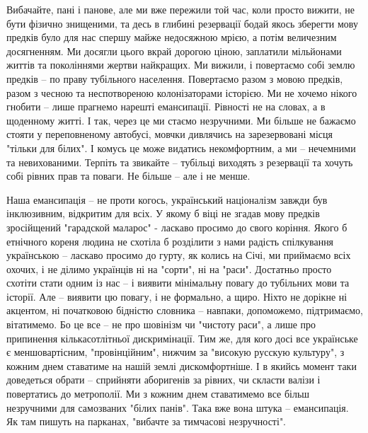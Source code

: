 Вибачайте, пані і панове, але ми вже пережили той час, коли просто вижити, не
бути фізично знищеними, та десь в глибині резервації бодай якось зберегти мову
предків було для нас спершу майже недосяжною мрією, а потім величезним
досягненням. Ми досягли цього вкрай дорогою ціною, заплатили мільйонами життів
та поколіннями жертви найкращих. Ми вижили, і повертаємо собі землю предків –
по праву тубільного населення. Повертаємо разом з мовою предків, разом з чесною
та неспотвореною колонізаторами історією. Ми не хочемо нікого гнобити – лише
прагнемо нарешті емансипації. Рівності не на словах, а в щоденному житті. І
так, через це ми стаємо незручними. Ми більше не бажаємо стояти у переповненому
автобусі, мовчки дивлячись на зарезервовані місця "тільки для білих". І комусь
це може видатись некомфортним, а ми – нечемними та невихованими. Терпіть та
звикайте – тубільці виходять з резервації та хочуть собі рівних прав та поваги.
Не більше – але і не менше.

Наша емансипація – не проти когось, український націоналізм завжди був
інклюзивним, відкритим для всіх. У якому б віці не згадав мову предків
зросійщений "гарадской маларос" - ласкаво просимо до свого коріння. Якого б
етнічного кореня людина не схотіла б розділити з нами радість спілкування
українською – ласкаво просимо до гурту, як колись на Січі, ми приймаємо всіх
охочих, і не ділимо українців ні на "сорти", ні на "раси". Достатньо просто
схотіти стати одним із нас – і виявити мінімальну повагу до тубільних мови та
історії. Але – виявити цю повагу, і не формально, а щиро. Ніхто не дорікне ні
акцентом, ні початковою бідністю словника – навпаки, допоможемо, підтримаємо,
вітатимемо. Бо це все – не про шовінізм чи "чистоту раси", а лише про
припинення кількасотлітньої дискримінації. Тим же, для кого досі все українське
є меншовартісним, "провінційним", нижчим за "високую русскую культуру", з
кожним днем ставатиме на нашій землі дискомфортніше. І в якийсь момент таки
доведеться обрати – сприйняти аборигенів за рівних, чи скласти валізи і
повертатись до метрополії. Ми з кожним днем ставатимемо все більш незручними
для самозваних "білих панів". Така вже вона штука – емансипація. Як там пишуть
на парканах, "вибачте за тимчасові незручності".
